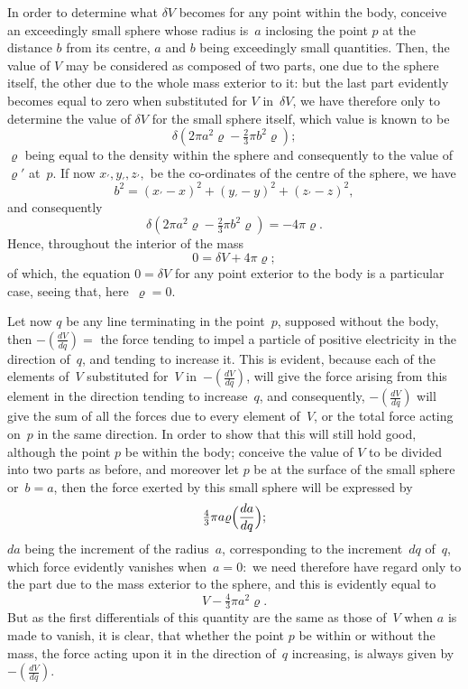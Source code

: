 \documentclass[11pt,notitlepage]{amsart}
\renewcommand{\rho}{\varrho}
\begin{document}
In order to determine what $\delta V$ becomes for any point within the body,
conceive an exceedingly small sphere whose radius is~$a$ inclosing the point $p$
at the distance $b$ from its centre,
$a$ and $b$ being exceedingly small quantities.
Then, the value of $V$ may be considered as composed of two parts, one due
to the sphere itself, the other due to the whole mass exterior to it: but the
last part evidently becomes equal to zero
when substituted for $V$ in~$\delta V$,
we have therefore only to determine the value of $\delta V$
for the small sphere
itself, which value is known to be
\[
\delta(2\pi a^2\rho-\tfrac23\pi b^2\rho);
\]
$\rho$ being equal to the density within the sphere
and consequently to the value
of $\rho'$ at~$p$. If now $x_\prime, y_\prime, z_\prime,$
be the co-ordinates of the centre of the sphere, we have
\[
b^2=(x_\prime-x)^2+(y_\prime-y)^2+(z_\prime-z)^2,
\]
and consequently
\[
\delta(2\pi a^2\rho-\tfrac23\pi b^2\rho)=-4\pi\rho.
\]
Hence, throughout the interior of the mass
\[
0=\delta V+4\pi\rho;
\]
of which, the equation $0=\delta V$
for any point exterior to the body is a particular case,
seeing that, here~$\rho=0$.

Let now $q$ be any line terminating in the point~$p$, supposed without
the body, then $-(\frac{dV}{dq})=$ the force
tending to impel a particle of positive
electricity in the direction of~$q$,
and tending to increase it. This is evident,
because each of the elements of~$V$ substituted
for~$V$ in~$-(\frac{dV}{dq})$, will give
the force arising from this element
in the direction tending to increase~$q$, and
consequently, $-(\frac{dV}{dq})$ will give the sum
of all the forces due to every element of~$V$,
or the total force acting on~$p$ in the same direction. In order
to show that this will still hold good,
although the point $p$ be within the body;
conceive the value of $V$ to be divided into two parts as before, and moreover
let $p$ be at the surface of the small sphere
or~${b=a}$, then the force exerted
by this small sphere will be expressed by
\[
\tfrac43\pi a\rho \Bigl(\frac{da}{dq}\Bigr);
\]
$da$ being the increment of the radius~$a$,
corresponding to the increment~$dq$
of~$q$, which force evidently vanishes when~${a=0}:$
we need therefore have
regard only to the part due to the mass exterior to the sphere, and this is
evidently equal to
\[
V-\tfrac43\pi a^2\rho.
\]
But as the first differentials of this quantity are the same
as those of~$V$ when
$a$ is made to vanish, it is clear,
that whether the point $p$ be within or without
the mass, the force acting upon it
in the direction of~$q$ increasing, is always
given by~$-(\frac{dV}{dq})$.
\end{document}

